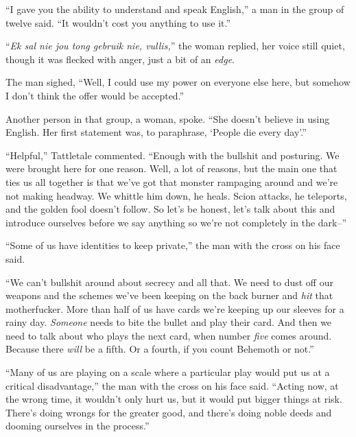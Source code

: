 ``I gave you the ability to understand and speak English,'' a man in the group of twelve said.  ``It wouldn't cost you anything to use it.''



``\emph{Ek sal nie jou tong gebruik nie, vullis,}'' the woman replied, her voice still quiet, though it was flecked with anger, just a bit of an \emph{edge}.



The man sighed, ``Well, I could use my power on everyone else here, but somehow I don't think the offer would be accepted.''



Another person in that group, a woman, spoke.  ``She doesn't believe in using English.  Her first statement was, to paraphrase, `People die every day'.''



``Helpful,'' Tattletale commented.  ``Enough with the bullshit and posturing.  We were brought here for one reason.  Well, a lot of reasons, but the main one that ties us all together is that we've got that monster rampaging around and we're not making headway.  We whittle him down, he heals.  Scion attacks, he teleports, and the golden fool doesn't follow.  So let's be honest, let's talk about this and introduce ourselves before we say anything so we're not completely in the dark--''



``Some of us have identities to keep private,'' the man with the cross on his face said.



``We can't bullshit around about secrecy and all that.  We need to dust off our weapons and the schemes we've been keeping on the back burner and \emph{hit} that motherfucker.  More than half of us have cards we're keeping up our sleeves for a rainy day.  \emph{Someone }needs to bite the bullet and play their card.  And then we need to talk about who plays the next card, when number \emph{five} comes around.  Because there \emph{will} be a fifth.  Or a fourth, if you count Behemoth or not.''



``Many of us are playing on a scale where a particular play would put us at a critical disadvantage,'' the man with the cross on his face said.  ``Acting now, at the wrong time, it wouldn't only hurt us, but it would put bigger things at risk.  There's doing wrongs for the greater good, and there's doing noble deeds and dooming ourselves in the process.''



